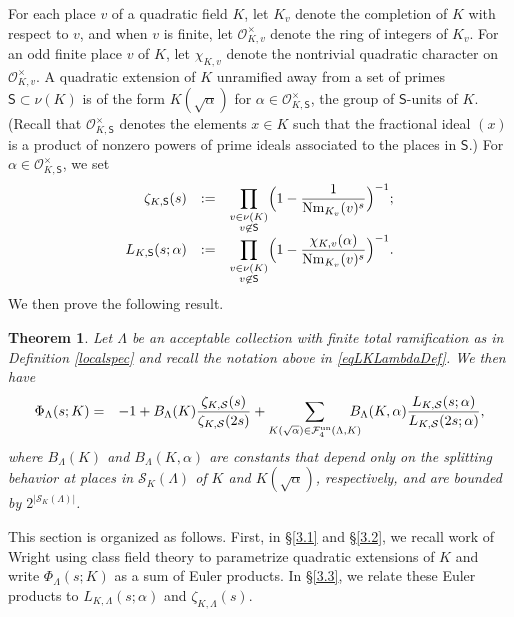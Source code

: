 \documentclass[10pt]{article}
\theoremstyle{plain}
\newtheorem{thm}{Theorem}[section]
\theoremstyle{definition}
\theoremstyle{remark}
\def\CS{{\mathsf S}}
\def\un{{\rm un}}
\def\val{{\nu}}
\def\FF{{\mathcal F}}
\def\O{{\mathcal O}}
\def\cO{{\mathcal O}}
\def\cS{{\mathcal S}}
\DeclareMathOperator{\Nm}{Nm}
\begin{document}
  For each place $v$ of a quadratic field $K$, let
$K_v$ denote the completion of $K$ with respect to $v$, and when $v$
is finite, let $\cO_{K,v}^\times$ denote the ring of integers of
$K_v$. For an odd finite place $v$ of $K$, let $\chi_{K,v}$ denote the
nontrivial quadratic character on $\cO_{K,v}^\times$. A quadratic extension of $K$ unramified away
from a set of primes $\CS \subset \nu(K)$ is of the form $K(\sqrt{\alpha})$ for
$\alpha\in\O_{K,\CS}^\times$, the group of $\CS$-units of $K$. (Recall
that $\O_{K,\CS}^\times$ denotes the elements $x \in K$ such that the
fractional ideal $(x)$ is a product of nonzero powers of prime ideals
associated to the places in $\CS$.) For
$\alpha\in\O_{K,\CS}^\times$, we set
\begin{equation}\label{eqLKLambdaDef}
\begin{array}{rcl}
\zeta_{K,\CS}(s)&:=&\displaystyle
\prod_{\substack{v\in\val(K)\\v\not\in \CS}}
\Bigl(1-\frac{1}{\Nm_{K_v}(v)^s}\Bigr)^{-1};\\[.2in]
L_{K,\CS}(s;\alpha)&:=&\displaystyle
\prod_{\substack{v\in\val(K)\\v\not\in \CS}}
\Bigl(1-\frac{\chi_{K,v}(\alpha)}{\Nm_{K_v}(v)^s}\Bigr)^{-1}.
\end{array}
\end{equation}
We then prove the following result.
\begin{thm}\label{thmsec2main}
Let $\Lambda$ be an acceptable collection with finite total ramification as in Definition \ref{localspec} and recall the notation above in \eqref{eqLKLambdaDef}. We then have
\begin{eqnarray}\label{eqScountser}
  \Phi_{\Lambda}(s;K) &=& -1+B_\Lambda(K)
  \frac{\zeta_{K,\cS}(s)}{\zeta_{K,\cS}(2s)} +
  \sum_{K(\sqrt{\alpha})\in\FF^\un_{4}(\Lambda, K)}\hspace{-10pt} B_\Lambda(K,\alpha)
  \frac{L_{K,\cS}(s;\alpha)}{L_{K,\cS}(2s;\alpha)},
\end{eqnarray}
where $B_\Lambda(K)$ and $B_\Lambda(K,\alpha)$ are constants that
depend only on the splitting behavior at places in $\cS_K(\Lambda)$ of
$K$ and $K(\sqrt{\alpha})$, respectively, and are bounded by
$2^{|\cS_K(\Lambda)|}$.
\end{thm}

This section is organized as follows. First, in \S\ref{3.1} and \S\ref{3.2}, we
recall work of Wright \cite{MR969545} using class field theory to
parametrize quadratic extensions of $K$ and write $\Phi_\Lambda(s;K)$
as a sum of Euler products. In \S\ref{3.3}, we relate these Euler products to
$L_{K,\Lambda}(s;\alpha)$ and $\zeta_{K,\Lambda}(s)$.
\end{document}
